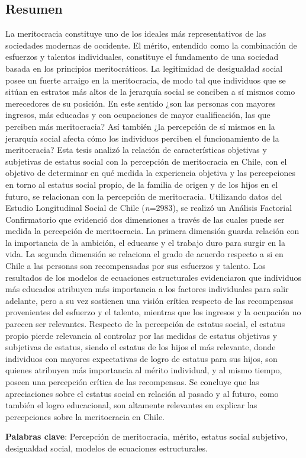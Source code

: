 
\thispagestyle{empty}
\begin{center}
	\section*{{\large Resumen}}
\end{center}
{\setlength{\parindent}{0cm} %
{\normalsize La meritocracia constituye uno de los ideales más representativos de las sociedades modernas de occidente. El mérito, entendido como la combinación de esfuerzos y talentos individuales, constituye el fundamento de una sociedad basada en los principios meritocráticos. La legitimidad de desigualdad social posee un fuerte arraigo en la meritocracia, de modo tal que individuos que se sitúan en estratos más altos de la jerarquía social se conciben a sí mismos como merecedores de su posición. En este sentido ¿son las personas con mayores ingresos, más educadas y con ocupaciones de mayor cualificación, las que perciben más meritocracia? Así también ¿la percepción de sí mismos en la jerarquía social afecta cómo los individuos perciben el funcionamiento de la meritocracia? Esta tesis analizó la relación de características objetivas y subjetivas de estatus social con la percepción de meritocracia en Chile, con el objetivo de determinar en qué medida la experiencia objetiva y las percepciones en torno al estatus social propio, de la familia de origen y de los hijos en el futuro, se relacionan con la percepción de meritocracia. Utilizando datos del Estudio Longitudinal Social de Chile (\textit{n}=2983), se realizó un Análisis Factorial Confirmatorio que evidenció dos dimensiones a través de las cuales puede ser medida la percepción de meritocracia. La primera dimensión guarda relación con la importancia de la ambición, el educarse y el trabajo duro para surgir en la vida. La segunda dimensión se relaciona el grado de acuerdo respecto a si en Chile a las personas son recompensadas por sus esfuerzos y talento. Los resultados de los modelos de ecuaciones estructurales evidenciaron que individuos más educados atribuyen más importancia a los factores individuales para salir adelante, pero a su vez sostienen una visión crítica respecto de las recompensas provenientes del esfuerzo y el talento, mientras que los ingresos y la ocupación no parecen ser relevantes. Respecto de la percepción de estatus social, el estatus propio pierde relevancia al controlar por las medidas de estatus objetivas y subjetivas de estatus, siendo el estatus de los hijos el más relevante, donde individuos con mayores expectativas de logro de estatus para sus hijos, son quienes atribuyen más importancia al mérito individual, y al mismo tiempo, poseen una percepción crítica de las recompensas. Se concluye que las apreciaciones sobre el estatus social en relación al pasado y al futuro, como también el logro educacional, son altamente relevantes en explicar las percepciones sobre la meritocracia en Chile.} 

\vspace{0.5cm}
\textbf{Palabras clave}: Percepción de meritocracia, mérito, estatus social subjetivo, desigualdad social, modelos de ecuaciones estructurales.
}